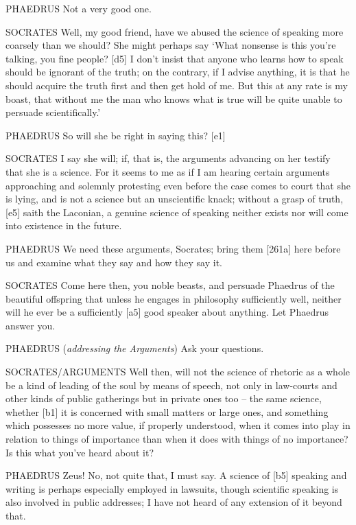 PHAEDRUS Not a very good one.

SOCRATES Well, my good friend, have we abused the science of speaking
more coarsely than we should? She might perhaps say ‘What nonsense is
this you're talking, you fine people? {[}d5{]} I don't insist that
anyone who learns how to speak should be ignorant of the truth; on the
contrary, if I advise anything, it is that he should acquire the truth
first and then get hold of me. But this at any rate is my boast, that
without me the man who knows what is true will be quite unable to
persuade scientifically.'

PHAEDRUS So will she be right in saying this? {[}e1{]}

SOCRATES I say she will; if, that is, the
arguments advancing on
her testify that she is a science. For it seems to me as if I am hearing
certain arguments approaching and solemnly protesting even before the
case comes to court that she is lying, and is not a science but an
unscientific knack; without a grasp of truth, {[}e5{]} saith the
Laconian, a genuine
science of speaking neither exists nor will come into existence in the
future.

PHAEDRUS We need these arguments, Socrates; bring them {[}261a{]} here
before us and examine what they say and how they say it.

SOCRATES Come here then, you noble beasts, and persuade Phaedrus of the
beautiful offspring that
unless he engages in philosophy sufficiently well, neither will he ever
be a sufficiently {[}a5{]} good speaker about anything. Let Phaedrus
answer you.

PHAEDRUS ({\em addressing the Arguments}) Ask your questions.

SOCRATES/ARGUMENTS Well then, will not the science of rhetoric as a
whole be a kind of leading of the soul by means of
speech, not only in
law-courts and other kinds of public gatherings but in private ones too
-- the same science, whether {[}b1{]} it is concerned with small matters
or large ones, and something which possesses no more value, if properly
understood, when it comes into play in relation to things of importance
than when it does with things of no importance? Is this what you've
heard about it?

PHAEDRUS Zeus! No, not quite that, I must say. A science of {[}b5{]}
speaking and writing is perhaps especially employed in lawsuits, though
scientific speaking is also involved in public addresses; I have not
heard of any extension of it beyond that.

